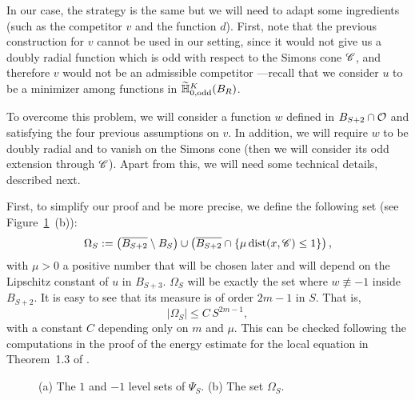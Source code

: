 In our case, the strategy is the same but we will need to adapt some ingredients (such as the competitor $v$ and the function $d$). First, note that the previous construction for $v$ cannot be used in our setting, since it would not give us a doubly radial function which is odd with respect to the Simons cone $\mathscr{C}$, and therefore $v$ would not be an admissible competitor ---recall that we consider $u$ to be a minimizer among functions in $\widetilde{\mathbb{H}}^K_{0, \mathrm{odd}}(B_R)$. 

To overcome this problem, we will consider a function $w$ defined in $B_{S+2}\cap \mathcal{O}$ and satisfying the four previous assumptions on $v$. In addition, we will require $w$ to be doubly radial and to vanish on the Simons cone (then we will consider its odd extension through $\mathscr{C}$). Apart from this, we will need some technical details, described next. 

First, to simplify our proof and be more precise, we define the following set (see Figure~\ref{Fig:PsiSandOmegaS}~(b)):
\begin{equation}
\label{Eq:DefOmegaS}
\Omega_S := \left( \overline{B_{S+2}}\setminus B_S \right) \cup \left(  \overline{B_{S+2}} \cap \{\mu \operatorname{dist}(x,\mathscr{C}) \leq 1\}\right),
\end{equation} 
with $\mu>0$ a positive number that will be chosen later and will depend on the Lipschitz constant of $u$ in $B_{S+3}$. $\Omega_S$ will be exactly the set where $w\not \equiv -1$ inside $B_{S+2}$. It is easy to see that its measure is of order $2m-1$ in $S$. That is,
 \begin{equation}
 \label{Eq:MeasureOmegaS}
 |\Omega_S| \leq C\,S^{2m-1},
 \end{equation}
with a constant $C$ depending only on $m$ and $\mu$. This can be checked following the computations in the proof of the energy estimate for the local equation in Theorem~1.3 of \cite{CabreTerraI}.

\begin{figure}
	\centering
	  \hspace{-0.26\textwidth} 
	\begin{subfigure}{0.21\textwidth}
		\centering
		
	\end{subfigure}
	  \hspace{0.28\textwidth} 
	\begin{subfigure}{0.21\textwidth}
		\centering		
		
	\end{subfigure}
	\caption{(a) The $1$ and $-1$ level sets of $\Psi_S$. (b) The set $\Omega_S$.}
	\label{Fig:PsiSandOmegaS}
\end{figure}



